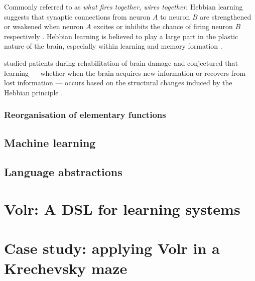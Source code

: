 \documentclass[a4paper,oneside]{memoir}
\begin{document}
Commonly referred to as \textit{what fires together, wires together}, Hebbian
learning suggests that synaptic connections from neuron $A$ to neuron $B$
are strengthened or weakened when neuron $A$ excites or inhibits the chance of
firing neuron $B$ respectively \autocite{dayan2001}.
Hebbian learning is believed to play a large part in the plastic nature of the
brain, especially within learning and memory formation
\autocite{dayan2001, Johnston2009, Robertson1999}.

\autocite{Robertson1999} studied patients during
rehabilitation of brain damage and conjectured that learning --- whether when the
brain acquires new information or recovers from lost information --- occurs based
on the structural changes induced by the Hebbian principle
\autocite{Robertson1999}.

\autocite{Mogensen2011}

\subsubsection{Reorganisation of elementary functions}
\label{ref}

\subsection{Machine learning}

\subsection{Language abstractions}

\section{Volr: A DSL for learning systems}
\label{volr}

\section{Case study: applying Volr in a Krechevsky maze}
\label{case}

\clearpage

\printglossary

\printbibliography
\end{document}
